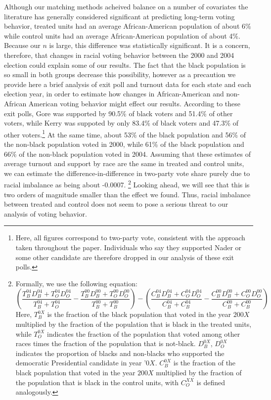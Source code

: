 Although our matching methods acheived balance on a number of covariates the literature has generally considered significant at predicting long-term voting behavior, treated units had an average African-American population of about 6\% while control units had an average African-American population of about 4\%. Because our $n$ is large, this difference was statistically significant. It is a concern, therefore, that changes in racial voting behavior between the 2000 and 2004 election could explain some of our results. The fact that the black population is so small in both groups decrease this possibility, however as a precaution we provide here a brief analysis of exit poll and turnout data for each state and each election year, in order to estimate how changes in African-American and non-African American voting behavior might effect our results. According to these exit polls, Gore was supported by 90.5\% of black voters and 51.4\% of other voters, while Kerry was suppoted by only 83.4\% of black voters and 47.3\% of other voters.\footnote{Here, all figures correspond to two-party vote, consistent with the approach taken throughout the paper. Individuals who say they supported Nader or some other candidate are therefore dropped in our analysis of these exit polls.}  At the same time, about 53\% of the black population and 56\% of the non-black population voted in 2000, while 61\% of the black population and 66\% of the non-black population voted in 2004. Assuming that these estimates of average turnout and support by race are the same in treated and control units, we can estimate the difference-in-difference in two-party vote share purely due to racial imbalance as being about -0.0007. \footnote{Formally, we use the following equation: $$(\frac{ T_B^{04} D_B^{04} +  T_O^{04}  D_O^{04}}{ T_B^{04} +  T_O^{04}} - \frac{ T_B^{00} D_B^{00} +  T_O^{00}  D_O^{00}}{ T_B^{00} +  T_B^{00}}) - (\frac{ C_B^{04} D_B^{04} +  C_O^{04}  D_O^{04}}{ C_B^{04} +  C_B^{04}} - \frac{ C_B^{00} D_B^{00} +  C_O^{00}  D_O^{00}}{ C_B^{00} +  C_B^{00}}) $$ 
Here, $T_B^{0X}$ is the fraction of the black population that voted in the year $200X$ multiplied by the fraction of the population that is black in the treated units, while $T_O^{0X}$ indicates the fraction of the population that voted among other races times the fraction of the population that is not-black.  $D_B^{0X}$, $D_O^{0X}$ indicates the proportion of blacks and non-blacks who supported the democratic Presidential candidate in year '$0X$. $C_B^{0X}$ is the fraction of the black population that voted in the year $200X$ multiplied by the fraction of the population that is black in the control units, with $C_O^{XX}$ is defined analogously.} Looking ahead, we will see that this is two orders of magnitude smaller than the effect we found. Thus, racial imbalance between treated and control does not seem to pose a serious threat to our analysis of voting behavior.
